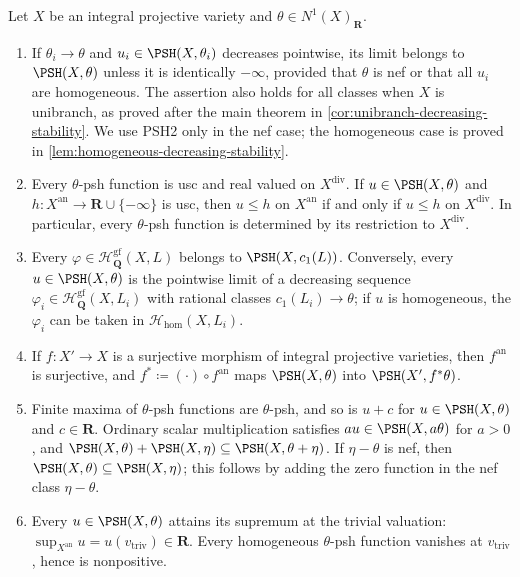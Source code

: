 \documentclass[11pt,a4paper]{article}
\newcommand{\an}{\mathrm{an}}          %
\newcommand{\divv}{\mathrm{div}}       %
\newcommand{\vtriv}{v_{\mathrm{triv}}} %
\begin{document}
\begin{proposition}\label{prop:BJ-package}
Let $X$ be an integral projective variety and $\theta\in N^1(X)_{\mathbf{R}}$.
\begin{enumerate}
\item If $\theta_i\to\theta$ and $u_i\in\PSH(X,\theta_i)$ decreases pointwise, its limit belongs to $\PSH(X,\theta)$ unless it is identically $-\infty$, provided that $\theta$ is nef or that all $u_i$ are homogeneous. The assertion also holds for all classes when $X$ is unibranch, as proved after the main theorem in \cref{cor:unibranch-decreasing-stability}. We use \textup{PSH2} only in the nef case; the homogeneous case is proved in \cref{lem:homogeneous-decreasing-stability}.
\item  Every $\theta$-psh function is usc and real valued on $X^{\divv}$.  If $u\in\PSH(X,\theta)$ and $h\colon X^{\an}\to\mathbf{R}\cup\{-\infty\}$ is usc, then $u\leq h$ on $X^{\an}$ if and only if $u\leq h$ on $X^{\divv}$.  In particular, every $\theta$-psh function is determined by its restriction to $X^{\divv}$.
\item  Every $\varphi\in\mathcal{H}^{\mathrm{gf}}_{\mathbf{Q}}(X,L)$ belongs to $\PSH(X,c_1(L))$.  Conversely, every $u\in\PSH(X,\theta)$ is the pointwise limit of a decreasing sequence $\varphi_i\in\mathcal{H}^{\mathrm{gf}}_{\mathbf{Q}}(X,L_i)$ with rational classes $c_1(L_i)\to\theta$; if $u$ is homogeneous, the $\varphi_i$ can be taken in $\mathcal{H}_{\mathrm{hom}}(X,L_i)$.
\item  If $f\colon X'\to X$ is a surjective morphism of integral projective varieties, then $f^{\an}$ is surjective, and $f^*\coloneqq(\cdot)\circ f^{\an}$ maps $\PSH(X,\theta)$ into $\PSH(X',f^*\theta)$.
\item  Finite maxima of $\theta$-psh functions are $\theta$-psh, and so is $u+c$ for $u\in\PSH(X,\theta)$ and $c\in\mathbf{R}$.  Ordinary scalar multiplication satisfies $a u\in\PSH(X,a\theta)$ for $a>0$, and $\PSH(X,\theta)+\PSH(X,\eta)\subseteq\PSH(X,\theta+\eta)$. If $\eta-\theta$ is nef, then $\PSH(X,\theta)\subseteq\PSH(X,\eta)$; this follows by adding the zero function in the nef class $\eta-\theta$.
\item  Every $u\in\PSH(X,\theta)$ attains its supremum at the trivial valuation: $\sup_{X^{\an}}u=u(\vtriv)\in\mathbf{R}$.  Every homogeneous $\theta$-psh function vanishes at $\vtriv$, hence is nonpositive.
\end{enumerate}
\end{proposition}
\end{document}
